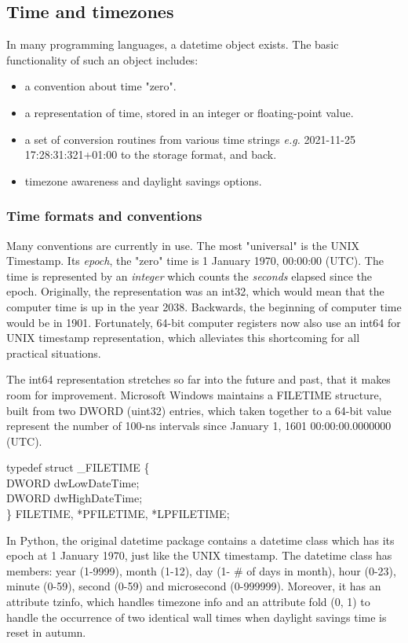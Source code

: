 \subsection{Time and timezones}

In many programming languages, a \textsf{datetime} object exists. The basic functionality of such an object includes:
\begin{itemize}
	\item a convention about time "zero".
	\item a representation of time, stored in an integer or floating-point value.
	\item a set of conversion routines from various time strings \textit{e.g.} \textsf{2021-11-25 17:28:31:321+01:00} to the storage format, and back.
	\item timezone awareness and daylight savings options.
\end{itemize}

\subsubsection{Time formats and conventions}

Many conventions are currently in use. The most "universal" is the UNIX Timestamp. Its \emph{epoch}, the "zero" time is 1 January 1970, 00:00:00 (UTC). The time is represented by an \emph{integer} which counts the \emph{seconds} elapsed since the epoch. Originally, the representation was an \textsf{int32}, which would mean that the computer time is up in the year 2038. Backwards, the beginning of computer time would be in 1901.
Fortunately, 64-bit computer registers now also use an \textsf{int64} for UNIX timestamp representation, which alleviates this shortcoming for all practical situations.

The \textsf{int64} representation stretches so far into the future and past, that it makes room for improvement. Microsoft Windows maintains a FILETIME
structure, built from two DWORD (uint32) entries, which taken together to a 64-bit value represent the number of 100-ns intervals since January 1, 1601 00:00:00.0000000 (UTC).

typedef struct \_FILETIME \{ \\
	DWORD dwLowDateTime; \\
	DWORD dwHighDateTime; \\
\} FILETIME, *PFILETIME, *LPFILETIME;

In Python, the original \textsf{datetime} package contains a \textsf{datetime} class which has its epoch at 1 January 1970, just like the UNIX timestamp.
The \textsf{datetime} class has members: \textsf{year} (1-9999), \textsf{month} (1-12), \textsf{day} (1- \# of days in month), \textsf{hour} (0-23), \textsf{minute} (0-59), \textsf{second} (0-59) and \textsf{microsecond} (0-999999). Moreover, it has an attribute \textsf{tzinfo}, which handles timezone info and an attribute \textsf{fold} (0, 1) to handle the occurrence of two identical wall times when daylight savings time is reset in autumn.

